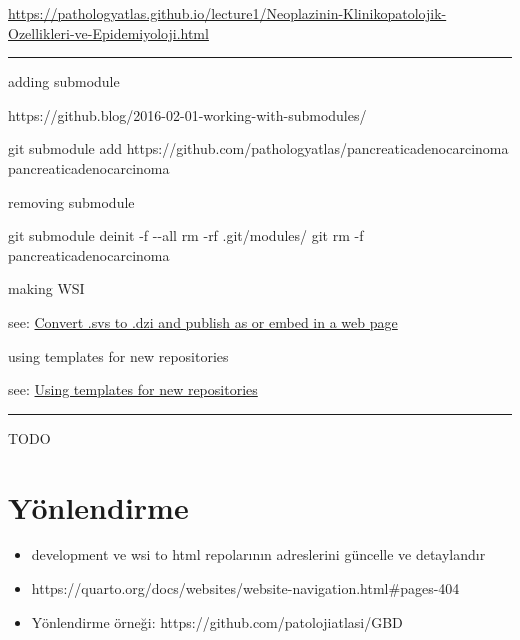 \documentclass[
  letterpaper,
  DIV=11,
  numbers=noendperiod]{scrreprt}
\newenvironment{Shaded}{}{}
\newcommand{\AttributeTok}[1]{\textcolor[rgb]{0.84,0.23,0.29}{#1}}
\newcommand{\FunctionTok}[1]{\textcolor[rgb]{0.44,0.26,0.76}{#1}}
\newcommand{\NormalTok}[1]{\textcolor[rgb]{0.14,0.16,0.18}{#1}}
\providecommand{\tightlist}{%
  \setlength{\itemsep}{0pt}\setlength{\parskip}{0pt}}
\begin{document}
\url{https://pathologyatlas.github.io/lecture1/Neoplazinin-Klinikopatolojik-Ozellikleri-ve-Epidemiyoloji.html}

\begin{center}\rule{0.5\linewidth}{0.5pt}\end{center}

adding submodule

https://github.blog/2016-02-01-working-with-submodules/

\begin{Shaded}
\begin{Highlighting}[]
\FunctionTok{git}\NormalTok{ submodule add https://github.com/pathologyatlas/pancreaticadenocarcinoma pancreaticadenocarcinoma}
\end{Highlighting}
\end{Shaded}

removing submodule

\begin{Shaded}
\begin{Highlighting}[]
\FunctionTok{git}\NormalTok{ submodule deinit }\AttributeTok{{-}f} \AttributeTok{{-}{-}all}
\FunctionTok{rm} \AttributeTok{{-}rf}\NormalTok{ .git/modules/}
\FunctionTok{git}\NormalTok{ rm }\AttributeTok{{-}f}\NormalTok{ pancreaticadenocarcinoma}
\end{Highlighting}
\end{Shaded}

making WSI

see:
\href{https://github.com/pathologyatlas/make-html-WSI\#convert-svs-to-dzi-and-publish-as-or-embed-in-a-web-page}{Convert
.svs to .dzi and publish as or embed in a web page}

using templates for new repositories

see: \href{https://github.com/pathologyatlas/template}{Using templates
for new repositories}

\begin{center}\rule{0.5\linewidth}{0.5pt}\end{center}

TODO

\hypertarget{yuxf6nlendirme}{%
\chapter{Yönlendirme}\label{yuxf6nlendirme}}

\begin{itemize}
\tightlist
\item
  development ve wsi to html repolarının adreslerini güncelle ve
  detaylandır
\item
  https://quarto.org/docs/websites/website-navigation.html\#pages-404
\item
  Yönlendirme örneği: https://github.com/patolojiatlasi/GBD
\end{itemize}
\end{document}
